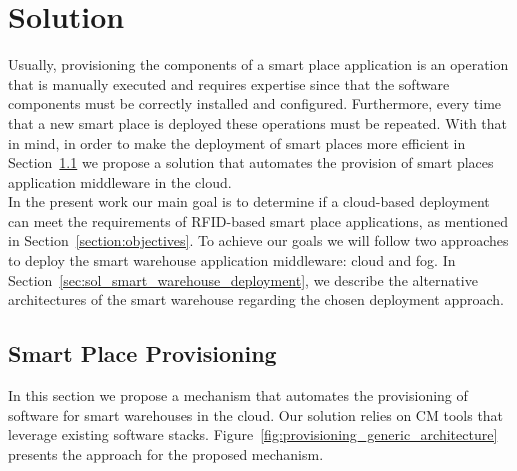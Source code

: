 
\chapter{Solution}
\label{chapter:solution}
Usually, provisioning the components of a smart place application is an operation
that is manually executed and requires expertise since that the software components must
be correctly installed and configured. Furthermore, every time that a new smart place is deployed
these operations must be repeated. With that in mind, in order to make the deployment of
smart places more efficient in Section~\ref{sec:sol_provisioning} we propose a solution
that automates the provision of smart places application middleware in the cloud.\\

In the present work our main goal is to determine if a cloud-based deployment can meet the
requirements of RFID-based smart place applications, as mentioned in Section~\ref{section:objectives}.
To achieve our goals we will follow two approaches to deploy the smart warehouse
application middleware: cloud and fog. In Section~\ref{sec:sol_smart_warehouse_deployment},
we describe the alternative architectures of the smart warehouse regarding the
chosen deployment approach.\\

\section{Smart Place Provisioning}
\label{sec:sol_provisioning}
In this section we propose a mechanism that automates the provisioning of software for smart warehouses
in the cloud. Our solution relies on \acrfull{CM} tools that leverage existing software stacks.
Figure~\ref{fig:provisioning_generic_architecture} presents the approach for the
proposed mechanism.\\

